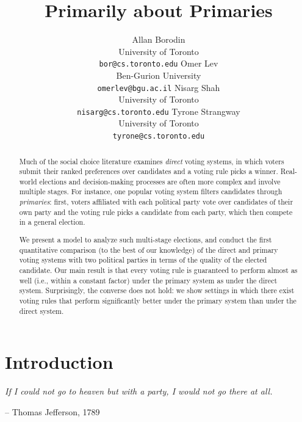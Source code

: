 \documentclass[letterpaper]{article} %
\theoremstyle{definition}
\begin{document}
%
\title{Primarily about Primaries}
\author{Allan Borodin\\University of Toronto\\\texttt{bor@cs.toronto.edu} \And Omer Lev\\Ben-Gurion University\\\texttt{omerlev@bgu.ac.il} \AND Nisarg Shah\\University of Toronto\\\texttt{nisarg@cs.toronto.edu} \And Tyrone Strangway\\University of Toronto\\\texttt{tyrone@cs.toronto.edu}}
\maketitle
\begin{abstract}
Much of the social choice literature examines \emph{direct} voting systems, in which voters submit their ranked preferences over candidates and a voting rule picks a winner. Real-world elections and decision-making processes are often more complex and involve multiple stages. For instance, one popular voting system filters candidates through \emph{primaries}: first, voters affiliated with each political party vote over candidates of their own party and the voting rule picks a candidate from each party, which then compete in a general election. 

We present a model to analyze such multi-stage elections, and conduct the first quantitative comparison (to the best of our knowledge) of the direct and primary voting systems with two political parties in terms of the quality of the elected candidate. Our main result is that every voting rule is guaranteed to perform almost as well 
(i.e., within a constant factor) under the primary system as under the direct system. Surprisingly, the converse does not hold: we show settings in which there exist voting rules that perform significantly better under the primary system than under the direct system.
\end{abstract}

\section{Introduction}

\epigraph{\emph{If I could not go to heaven but with a party, I would not go there at all.}}{-- Thomas Jefferson, 1789}
\end{document}
